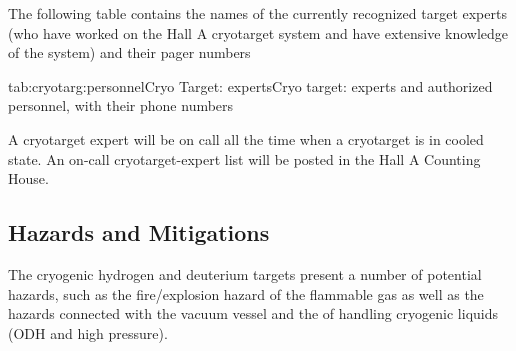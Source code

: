 \begin{safetyen}{10}{10} 

The following table contains the names of the currently recognized
target experts (who have worked on the Hall A cryotarget system and
have extensive knowledge of the system) and their pager numbers

\begin{namestab}{tab:cryotarg:personnel}{Cryo Target: experts}{Cryo
target: experts and authorized personnel, with their phone numbers}
 
 
 
\end{namestab}

A cryotarget expert will be on call all the time when a cryotarget
is in cooled state. An on-call cryotarget-expert list will be posted
in the Hall A Counting House.
\end{safetyen}

\begin{safetyen}{0}{0} 
\label{sec:target-cryo-safety}

\subsection{Hazards and Mitigations}

The cryogenic hydrogen and deuterium targets present a number of potential
hazards, such as the fire/explosion hazard of the flammable gas as
well as the hazards connected with the vacuum vessel and the of handling
cryogenic liquids (ODH and high pressure).  \end{safetyen} 

